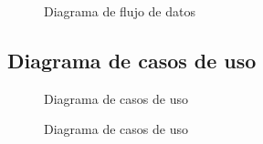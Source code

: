 \documentclass[12pt,twoside]{article}
\begin{document}
	\begin{figure}[H]
		\centering
		\caption{Diagrama de flujo de datos}
		\label{diagrama: flujo_datos}
	\end{figure}
	
	\subsection{Diagrama de casos de uso}
	
	\begin{figure}[H]
		\centering
		\caption{Diagrama de casos de uso}
		\label{diagrama: casos_de_uso1}
	\end{figure}
	
	\begin{figure}[h!]
		\centering
		\caption{Diagrama de casos de uso}
		\label{diagrama: casos_de_uso2}
	\end{figure}
	
\end{document}
